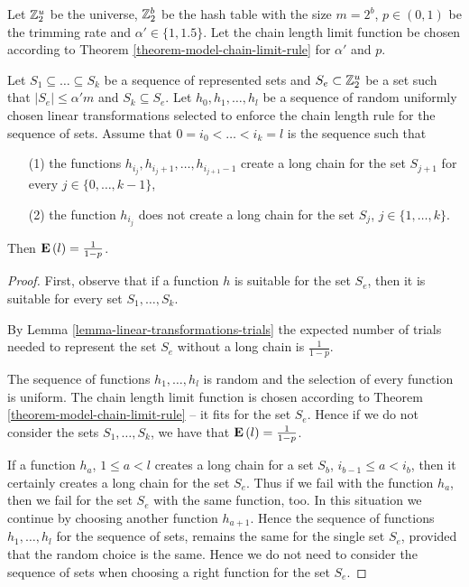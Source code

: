 \begin{lemma}
\label{lemma-sets}
Let $\mathbb{Z}_{2}^{u}$ be the universe, $\mathbb{Z}_{2}^{b}$ be the hash table with the size $m = 2 ^ b$, $p \in (0, 1)$ be the trimming rate and $\alpha' \in \{1, 1.5\}$. Let the chain length limit function be chosen according to Theorem \ref{theorem-model-chain-limit-rule} for $\alpha'$ and $p$. 

Let $S_1 \subseteq \dots \subseteq S_k$ be a sequence of represented sets and $S_e \subset \mathbb{Z}_{2}^{u}$ be a set such that $|S_e| \leq \alpha'm$ and $S_k \subseteq S_e$. Let $h_0, h_1, \dots, h_l$ be a sequence of random uniformly chosen linear transformations selected to enforce the chain length rule for the sequence of sets. Assume that $0 = i_0 < \dots < i_k = l$ is the sequence such that 
\begin{enumerate}
\item[(1)] the functions $h_{i_{j}}, h_{i_{j} + 1}, \dots, h_{i_{j + 1} - 1}$ create a long chain for the set $S_{j + 1}$ for every $j \in \{0, \dots, k - 1 \}$,
\item[(2)] the function $h_{i_{j}}$ does not create a long chain for the set $S_j$, $j \in \{1, \dots, k\}$.
\end{enumerate}
Then $\mathbf{E}\left(l\right) = \frac{1}{1 - p}$.
\end{lemma}
\begin{proof}
First, observe that if a function $h$ is suitable for the set $S_e$, then it is suitable for every set $S_1, \dots, S_k$.

By Lemma \ref{lemma-linear-transformations-trials} the expected number of trials needed to represent the set $S_e$ without a long chain is $\frac{1}{1 - p}$.

The sequence of functions $h_1, \dots, h_l$ is random and the selection of every function is uniform. The chain length limit function is chosen according to Theorem \ref{theorem-model-chain-limit-rule} -- it fits for the set $S_e$. Hence if we do not consider the sets $S_1, \dots, S_k$, we have that $\mathbf{E}\left(l\right) = \frac{1}{1 - p}$.

If a function $h_a$, $1 \leq a < l$ creates a long chain for a set $S_b$, $i_{b - 1} \leq a < i_b$, then it certainly creates a long chain for the set $S_e$. Thus if we fail with the function $h_a$, then we fail for the set $S_e$ with the same function, too. In this situation we continue by choosing another function $h_{a + 1}$. Hence the sequence of functions $h_1, \dots, h_l$ for the sequence of sets, remains the same for the single set $S_e$, provided that the random choice is the same. Hence we do not need to consider the sequence of sets when choosing a right function for the set $S_e$.
\end{proof}

